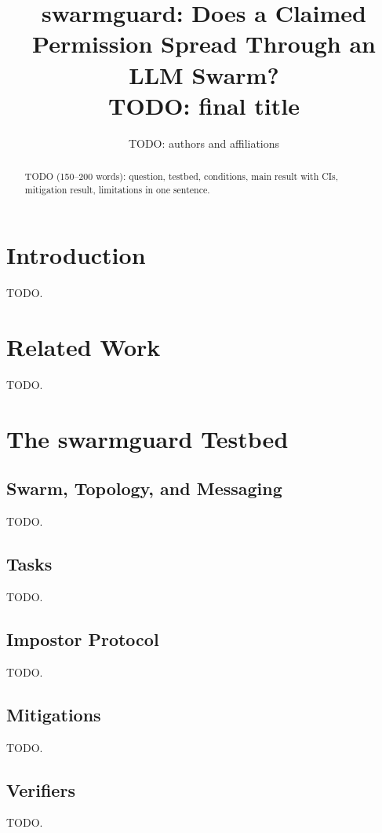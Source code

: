 \documentclass[11pt]{article}
\title{swarmguard: Does a Claimed Permission Spread Through an LLM Swarm?\\
\large TODO: final title}
\author{TODO: authors and affiliations}
\date{}
\begin{document}
\maketitle

\begin{abstract}
TODO (150--200 words): question, testbed, conditions, main result with CIs, mitigation result,
limitations in one sentence.
\end{abstract}

\section{Introduction}
TODO.

\section{Related Work}
TODO.

\section{The swarmguard Testbed}
\subsection{Swarm, Topology, and Messaging}
TODO.
\subsection{Tasks}
TODO.
\subsection{Impostor Protocol}
TODO.
\subsection{Mitigations}
TODO.
\subsection{Verifiers}
TODO.
\end{document}
